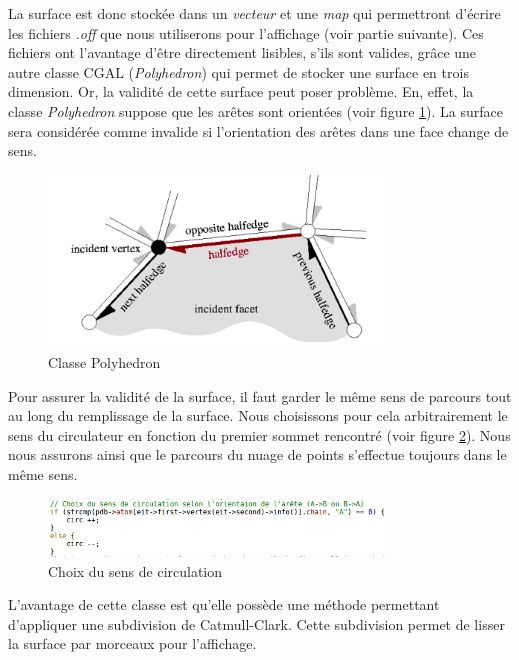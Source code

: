 La surface est donc stockée dans un \textit{vecteur} et une \textit{map} qui permettront
d'écrire les fichiers \textit{.off} que nous utiliserons pour l'affichage (voir partie
suivante). Ces fichiers ont l'avantage d'être directement lisibles, s'ils sont valides,
grâce une autre classe CGAL (\textit{Polyhedron}) qui permet de stocker
une surface en trois dimension.
Or, la validité de cette surface peut poser problème. En, effet, la classe \textit{Polyhedron}
suppose que les arêtes sont orientées (voir figure \ref{fig::polyheder}). La surface
sera considérée comme invalide si l'orientation des arêtes dans une face change de sens.
\begin{figure}[ht]
\centering
  \includegraphics[width=0.8\textwidth]{figures/polyheder.png}
  \caption{Classe Polyhedron \cite{CGAL}}
  \label{fig::polyheder}
\end{figure}

Pour assurer la validité de la surface, il faut garder le même sens de parcours
tout au long du remplissage de la surface. Nous choisissons pour cela arbitrairement le sens
du circulateur en fonction du premier sommet rencontré (voir figure \ref{fig::choix_sens}).
Nous nous assurons ainsi que le parcours du nuage de points s'effectue toujours dans le même
sens.
\begin{figure}[ht]
\centering
  \includegraphics[width=0.8\textwidth]{figures/choix_sens.png}
  \caption{Choix du sens de circulation}
  \label{fig::choix_sens}
\end{figure}



 L'avantage de cette classe est qu'elle possède
une méthode permettant d'appliquer une subdivision de Catmull-Clark.
Cette subdivision permet de lisser la surface par morceaux
pour l'affichage.


